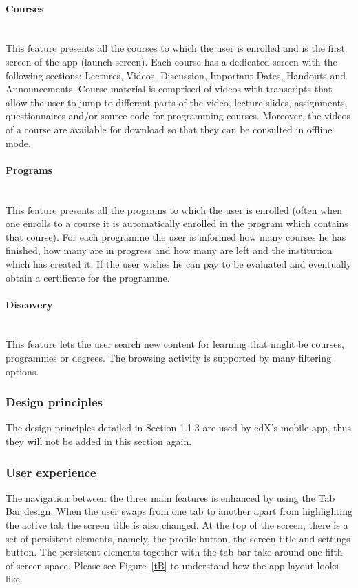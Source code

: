 \documentclass[version=last,fontsize=13pt]{scrartcl}
\newcommand{\myparagraph}[1]{\paragraph{#1}\mbox{}\\}
\begin{document}
		\myparagraph{Courses}
		\indent
			This feature presents all the courses to which the user is enrolled and is the first screen of the app (launch screen). Each course has a dedicated screen with the following sections: Lectures, Videos, Discussion, Important Dates, Handouts and Announcements. Course material is comprised of videos with transcripts that allow the user to jump to different parts of the video, lecture slides, assignments, questionnaires and/or source code for programming courses. Moreover, the videos of a course are available for download so that they can be consulted in offline mode.

		\myparagraph{Programs}
		\indent
			This feature presents all the programs to which the user is enrolled (often when one enrolls to a course it is automatically enrolled in the program which contains that course). For each programme the user is informed how many courses he has finished, how many are in progress and how many are left and the institution which has created it. If the user wishes he can pay to be evaluated and eventually obtain a certificate for the programme.


		\myparagraph{Discovery}
		\indent
		This feature lets the user  search new content for learning that might be courses, programmes or degrees. The browsing activity is supported by many filtering options.

		\subsubsection{Design principles}
		The design principles detailed in Section 1.1.3 are used by edX's mobile app, thus they will not be added in this section again.

		\subsubsection{User experience}
		The navigation between the three main features is enhanced by using the Tab Bar design. When the user swaps from one tab to another apart from highlighting the active tab the screen title is also changed. At the top of the screen, there is a set of persistent elements, namely, the profile button, the screen title and settings button. The persistent elements together with the tab bar take around one-fifth of screen space. Please see Figure~\ref{tB} to understand how the app layout looks like.
\end{document}
